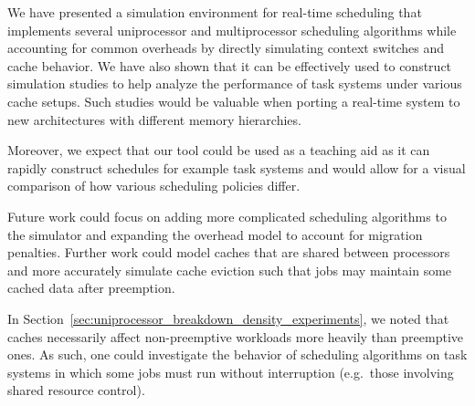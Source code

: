 \documentclass[11pt]{article}
\newcommand{\secref}[1]{Section~\ref{#1}}
\begin{document}
We have presented a simulation environment for real-time scheduling that implements several uniprocessor and multiprocessor scheduling algorithms while accounting for common overheads by directly simulating context switches and cache behavior. We have also shown that it can be effectively used to construct simulation studies to help analyze the performance of task systems under various cache setups. Such studies would be valuable when porting a real-time system to new architectures with different memory hierarchies.

Moreover, we expect that our tool could be used as a teaching aid as it can rapidly construct schedules for example task systems and would allow for a visual comparison of how various scheduling policies differ.

Future work could focus on adding more complicated scheduling algorithms to the simulator and expanding the overhead model to account for migration penalties. Further work could model caches that are shared between processors and more accurately simulate cache eviction such that jobs may maintain some cached data after preemption.

In \secref{sec:uniprocessor_breakdown_density_experiments}, we noted that caches necessarily affect non-preemptive workloads more heavily than preemptive ones. As such, one could investigate the behavior of scheduling algorithms on task systems in which some jobs must run without interruption (e.g.\ those involving shared resource control).
\end{document}
